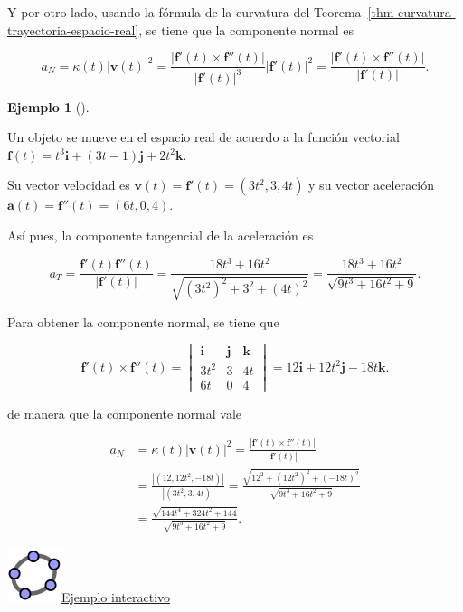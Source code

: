 \documentclass[
  a4paper,
]{scrreport}
\theoremstyle{definition}
\newtheorem{example}{Ejemplo}[chapter]
\theoremstyle{plain}
\theoremstyle{definition}
\theoremstyle{definition}
\theoremstyle{plain}
\theoremstyle{plain}
\theoremstyle{remark}
\begin{document}
Y por otro lado, usando la fórmula de la curvatura del
Teorema~\ref{thm-curvatura-trayectoria-espacio-real}, se tiene que la
componente normal es

\[
a_N 
= \kappa(t)|\mathbf{v}(t)|^2 
= \frac{|\mathbf{f}'(t)\times \mathbf{f}''(t)|}{|\mathbf{f}'(t)|^3}|\mathbf{f}'(t)|^2
= \frac{|\mathbf{f}'(t)\times \mathbf{f}''(t)|}{|\mathbf{f}'(t)|}.
\]

\begin{example}[]\protect\hypertarget{exm-componente-tangencial-normal-trayectoria}{}\label{exm-componente-tangencial-normal-trayectoria}

Un objeto se mueve en el espacio real de acuerdo a la función vectorial
\(\mathbf{f}(t) = t^3\mathbf{i} + (3t-1)\mathbf{j} + 2t^2 \mathbf{k}\).

Su vector velocidad es \(\mathbf{v}(t)=\mathbf{f}'(t) = (3t^2, 3, 4t)\)
y su vector aceleración \(\mathbf{a}(t) = \mathbf{f}''(t)=(6t, 0, 4)\).

Así pues, la componente tangencial de la aceleración es

\[
a_T
= \frac{\mathbf{f}'(t)\mathbf{f}''(t)}{|\mathbf{f}'(t)|}
= \frac{18t^3+16t^2}{\sqrt{(3t^2)^2 + 3^2 + (4t)^2}}
= \frac{18t^3+16t^2}{\sqrt{9t^3+16t^2+9}}.
\]

Para obtener la componente normal, se tiene que

\[
\mathbf{f}'(t)\times \mathbf{f}''(t)
=
\begin{vmatrix}
\mathbf{i} & \mathbf{j} &\mathbf{k}\\
3t^2 & 3 & 4t \\
6t & 0 & 4
\end{vmatrix}
= 12\mathbf{i}+12t^2\mathbf{j}-18t\mathbf{k}.
\]

de manera que la componente normal vale

\begin{align*}
a_N 
&= \kappa(t)|\mathbf{v}(t)|^2 
= \frac{|\mathbf{f}'(t)\times \mathbf{f}''(t)|}{|\mathbf{f}'(t)|} \\
&= \frac{|(12, 12t^2, -18t)|}{|(3t^2,3,4t)|}
= \frac{\sqrt{12^2+(12t^2)^2+(-18t)^2}}{\sqrt{9t^3+16t^2+9}} \\
&= \frac{\sqrt{144t^4+324t^2+144}}{\sqrt{9t^3+16t^2+9}}.
\end{align*}

\end{example}

\href{https://www.geogebra.org/m/kcnxeccy}{\includegraphics{img/logos/logo-geogebra.png}Ejemplo
interactivo}
\end{document}
